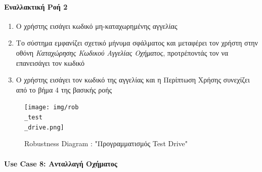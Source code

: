 \documentclass{../ol-softwaremanual}
\begin{document}
	
	\paragraph{Εναλλακτική Ροή 2}
	
	\begin{enumerate}
		\item Ο χρήστης εισάγει κωδικό μη-καταχωρημένης αγγελίας
		\item Το σύστημα εμφανίζει σχετικό μήνυμα σφάλματος και μεταφέρει τον χρήστη στην οθόνη \textit{Καταχώρησης Κωδικού Αγγελίας Οχήματος}, προτρέποντάς τον να επανεισάγει τον κωδικό
		\item Ο χρήστης εισάγει τον κωδικό της αγγελίας και η Περίπτωση Χρήσης συνεχίζει από το βήμα 4 της βασικής ροής
	\end{enumerate}
	
	\begin{figure}[htbp!]
		\texttt{[image: img/rob\\\_test\\\_drive.png]}
		\caption{\en Robustness Diagram : "\gr Προγραμματισμός \en Test Drive"\gr}
	\end{figure}
	
	\newpage
	\centering
	
	\paragraph{\en Use Case 8: \gr  Ανταλλαγή Οχήματος \gr}
	
\end{document}
